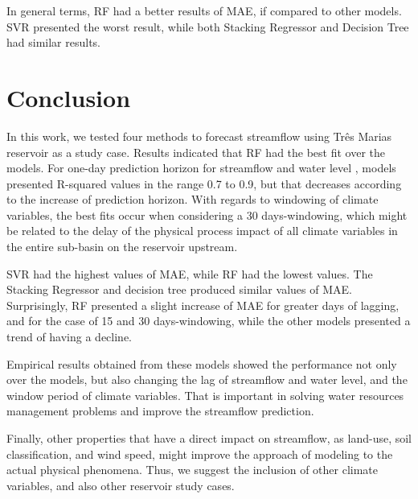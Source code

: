 \documentclass[12pt]{article}
\begin{document}
In general terms, RF had a better results of MAE, if compared to other models. SVR presented the worst result, while both Stacking Regressor and Decision Tree had similar results.

\section{Conclusion}

In this work, we tested four methods to forecast streamflow using Três Marias reservoir as a study case. Results indicated that RF had the best fit over the models.  For one-day prediction horizon for streamflow and water level , models presented R-squared values in the range 0.7 to 0.9, but that decreases according to the increase of  prediction horizon. With regards to windowing of climate variables, the best fits occur when considering a 30 days-windowing, which might be related to the delay of the physical process impact of all climate variables in the entire sub-basin on the reservoir upstream.

SVR had the highest values of MAE, while RF had the lowest values. The Stacking Regressor and decision tree produced similar values of MAE. Surprisingly, RF presented a slight increase of MAE for greater days of lagging, and for the case of 15 and 30 days-windowing, while the other models presented a trend of having a decline.

Empirical results obtained from these models showed the performance not only over the models, but also changing the lag of streamflow and water level, and the window period of climate variables. That is important in solving water resources management problems and improve the streamflow prediction.

Finally, other properties that have a direct impact on streamflow, as land-use, soil classification, and wind speed, might improve the approach of modeling to the actual physical phenomena. Thus, we suggest the inclusion of other climate variables, and also other reservoir study cases.





\appendix

\end{document}
